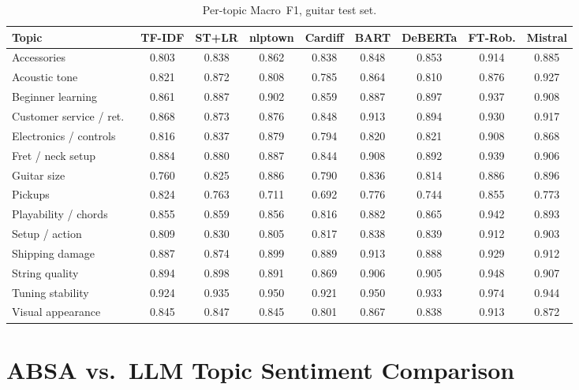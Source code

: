 \documentclass[11pt]{article}
\begin{document}
\begin{table}[t]
\centering
\small
\setlength{\tabcolsep}{3.5pt}
\caption{Per-topic Macro~F1, guitar test set.}
\label{tab:pertopic}
\begin{tabular}{lcccccccc}
\toprule
\textbf{Topic}
  & \textbf{TF-IDF}
  & \textbf{ST+LR}
  & \textbf{nlptown}
  & \textbf{Cardiff}
  & \textbf{BART}
  & \textbf{DeBERTa}
  & \textbf{FT-Rob.}
  & \textbf{Mistral} \\
\midrule
Accessories              & 0.803 & 0.838 & 0.862 & 0.838 & 0.848 & 0.853 & 0.914 & 0.885 \\
Acoustic tone            & 0.821 & 0.872 & 0.808 & 0.785 & 0.864 & 0.810 & 0.876 & 0.927 \\
Beginner learning        & 0.861 & 0.887 & 0.902 & 0.859 & 0.887 & 0.897 & 0.937 & 0.908 \\
Customer service / ret.\ & 0.868 & 0.873 & 0.876 & 0.848 & 0.913 & 0.894 & 0.930 & 0.917 \\
Electronics / controls   & 0.816 & 0.837 & 0.879 & 0.794 & 0.820 & 0.821 & 0.908 & 0.868 \\
Fret / neck setup        & 0.884 & 0.880 & 0.887 & 0.844 & 0.908 & 0.892 & 0.939 & 0.906 \\
Guitar size              & 0.760 & 0.825 & 0.886 & 0.790 & 0.836 & 0.814 & 0.886 & 0.896 \\
Pickups                  & 0.824 & 0.763 & 0.711 & 0.692 & 0.776 & 0.744 & 0.855 & 0.773 \\
Playability / chords     & 0.855 & 0.859 & 0.856 & 0.816 & 0.882 & 0.865 & 0.942 & 0.893 \\
Setup / action           & 0.809 & 0.830 & 0.805 & 0.817 & 0.838 & 0.839 & 0.912 & 0.903 \\
Shipping damage          & 0.887 & 0.874 & 0.899 & 0.889 & 0.913 & 0.888 & 0.929 & 0.912 \\
String quality           & 0.894 & 0.898 & 0.891 & 0.869 & 0.906 & 0.905 & 0.948 & 0.907 \\
Tuning stability         & 0.924 & 0.935 & 0.950 & 0.921 & 0.950 & 0.933 & 0.974 & 0.944 \\
Visual appearance        & 0.845 & 0.847 & 0.845 & 0.801 & 0.867 & 0.838 & 0.913 & 0.872 \\
\bottomrule
\end{tabular}
\end{table}

\section{ABSA vs.\ LLM Topic Sentiment Comparison}
\label{app:absa}
\end{document}
